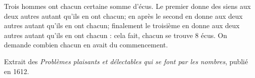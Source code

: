 \begin{exercice}\label{exoLineraire0003}

Trois hommes ont chacun certaine somme d'écus. Le premier donne des siens aux deux autres autant qu'ils en ont chacun; en après le second en donne aux deux autres autant qu'ils en ont chacun; finalement le troisième en donne aux deux autres autant qu'ils en ont chacun : cela fait, chacun se trouve $8$ écus. On demande combien chacun en avait du commencement.

Extrait des \emph{Problèmes plaisants et délectables qui se font par les nombres}, publié en 1612.

\end{exercice}
